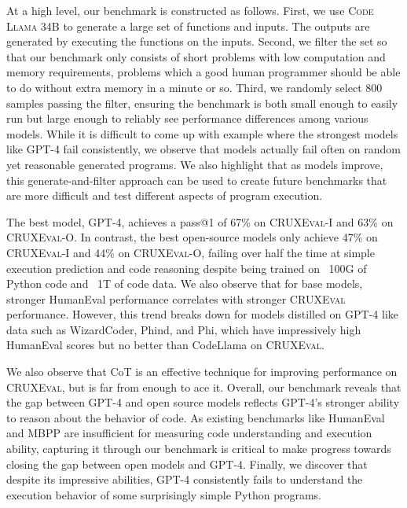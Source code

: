 \documentclass[twoside,11pt,preprint]{article}
\newcommand{\benchmark}{\textsc{CRUXEval}\xspace}
\newcommand{\benchmarki}{\textsc{CRUXEval-I}\xspace}
\newcommand{\benchmarko}{\textsc{CRUXEval-O}\xspace}
\newcommand{\codellamalarge}{\textsc{Code Llama 34B}\xspace}
\begin{document}
At a high level, our benchmark is constructed as follows. First, we use \codellamalarge to generate a large set of functions and inputs. The outputs are generated by executing the functions on the inputs. Second, we filter the set so that our benchmark only consists of short problems with low computation and memory requirements, problems which a good human programmer should be able to do without extra memory in a minute or so. Third, we randomly select 800 samples passing the filter, ensuring the benchmark is both small enough to easily run but large enough to reliably see performance differences among various models. While it is difficult to come up with example where the strongest models like GPT-4 fail consistently, we observe that models actually fail often on random yet reasonable generated programs. We also highlight that as models improve, this generate-and-filter approach can be used to create future benchmarks that are more difficult and test different aspects of program execution.

The best model, GPT-4, achieves a pass@1 of 67\% on \benchmarki and 63\% on \benchmarko. In contrast, the best open-source models only achieve 47\% on \benchmarki and 44\% on \benchmarko, failing over half the time at simple execution prediction and code reasoning despite being trained on ~100G of Python code and ~1T of code data. We also observe that for base models, stronger HumanEval performance correlates with stronger \benchmark performance. However, this trend breaks down for models distilled on GPT-4 like data such as WizardCoder, Phind, and Phi, which have impressively high HumanEval scores but no better than CodeLlama on \benchmark.

We also observe that CoT is an effective technique for improving performance on \benchmark, but is far from enough to ace it. Overall, our benchmark reveals that the gap between GPT-4 and open source models reflects GPT-4's stronger ability to reason about the behavior of code. As existing benchmarks like HumanEval and MBPP are insufficient for measuring code understanding and execution ability, capturing it through our benchmark is critical to make progress towards closing the gap between open models and GPT-4. Finally, we discover that despite its impressive abilities, GPT-4 consistently fails to understand the execution behavior of some surprisingly simple Python programs. 


%
\end{document}
